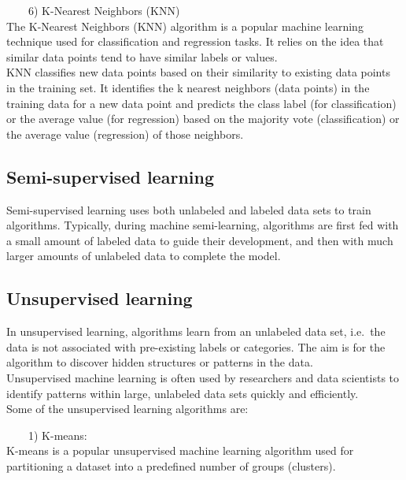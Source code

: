 \documentclass[
]{book}
\begin{document}
~~~~6) K-Nearest Neighbors (KNN)\\
The K-Nearest Neighbors (KNN) algorithm is a popular machine learning technique used for classification and regression tasks. It relies on the idea that similar data points tend to have similar labels or values.\\
KNN classifies new data points based on their similarity to existing data points in the training set. It identifies the k nearest neighbors (data points) in the training data for a new data point and predicts the class label (for classification) or the average value (for regression) based on the majority vote (classification) or the average value (regression) of those neighbors.

\hypertarget{semi-supervised-learning}{%
\subsection*{Semi-supervised learning}\label{semi-supervised-learning}}

Semi-supervised learning uses both unlabeled and labeled data sets to train algorithms. Typically, during machine semi-learning, algorithms are first fed with a small amount of labeled data to guide their development, and then with much larger amounts of unlabeled data to complete the model.

\hypertarget{unsupervised-learning}{%
\subsection*{Unsupervised learning}\label{unsupervised-learning}}

In unsupervised learning, algorithms learn from an unlabeled data set, i.e.~the data is not associated with pre-existing labels or categories. The aim is for the algorithm to discover hidden structures or patterns in the data.\\
Unsupervised machine learning is often used by researchers and data scientists to identify patterns within large, unlabeled data sets quickly and efficiently.\\
Some of the unsupervised learning algorithms are:

~~~~1) K-means:\\
K-means is a popular unsupervised machine learning algorithm used for partitioning a dataset into a predefined number of groups (clusters).
\end{document}
